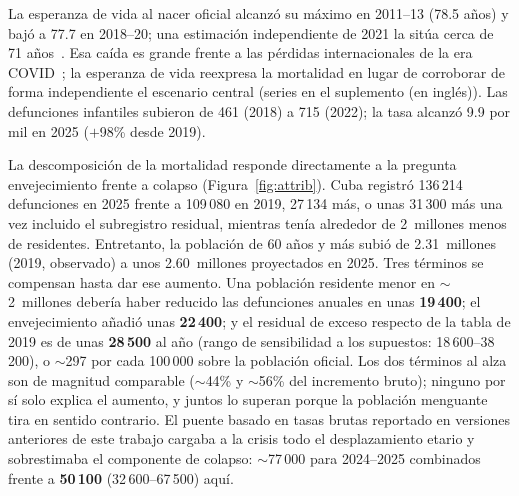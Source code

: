 \documentclass[11pt,a4paper]{article}
\begin{document}
La esperanza de vida al nacer oficial alcanzó su máximo en 2011--13 (78.5 años) y bajó a 77.7 en 2018--20; una estimación independiente de 2021 la sitúa cerca de 71 años~\citep{albizu2023,bronnum2023}.
Esa caída es grande frente a las pérdidas internacionales de la era COVID~\citep{aburto2022,msemburi2023}; la esperanza de vida reexpresa la mortalidad en lugar de corroborar de forma independiente el escenario central (series en el suplemento (en inglés)).
Las defunciones infantiles subieron de 461 (2018) a 715 (2022); la tasa alcanzó 9.9 por mil en 2025 ($+$98\% desde 2019).

La descomposición de la mortalidad responde directamente a la pregunta envejecimiento frente a colapso (Figura~\ref{fig:attrib}).
Cuba registró 136\,214 defunciones en 2025 frente a 109\,080 en 2019, 27\,134 más, o unas 31\,300 más una vez incluido el subregistro residual, mientras tenía alrededor de 2~millones menos de residentes.
Entretanto, la población de 60 años y más subió de 2.31~millones (2019, observado) a unos 2.60~millones proyectados en 2025.
Tres términos se compensan hasta dar ese aumento.
Una población residente menor en $\sim$2~millones debería haber reducido las defunciones anuales en unas \textbf{19\,400}; el envejecimiento añadió unas \textbf{22\,400}; y el residual de exceso respecto de la tabla de 2019 es de unas \textbf{28\,500} al año (rango de sensibilidad a los supuestos: 18\,600--38\,200), o $\sim$297 por cada 100\,000 sobre la población oficial.
Los dos términos al alza son de magnitud comparable ($\sim$44\% y $\sim$56\% del incremento bruto); ninguno por sí solo explica el aumento, y juntos lo superan porque la población menguante tira en sentido contrario.
El puente basado en tasas brutas reportado en versiones anteriores de este trabajo cargaba a la crisis todo el desplazamiento etario y sobrestimaba el componente de colapso: $\sim$77\,000 para 2024--2025 combinados frente a \textbf{50\,100} (32\,600--67\,500) aquí.
\end{document}
